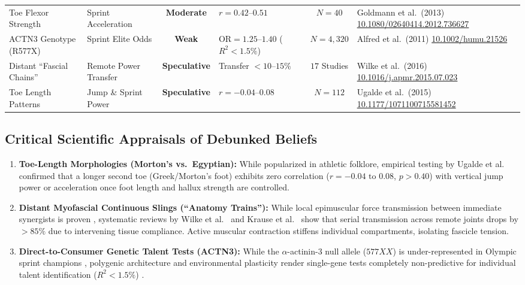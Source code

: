 \documentclass[11pt,a4paper]{article}
\begin{document}
\begin{table}[htbp]
\begin{tabularx}{\textwidth}{p{3.2cm}p{2.8cm}cp{2.2cm}cp{3.4cm}}
\addlinespace
Toe Flexor Strength & Sprint Acceleration & \textbf{Moderate} & $r = 0.42\text{--}0.51$ & $N = 40$ & Goldmann et al.\ (2013) \cite{goldmann2013} \newline \href{https://doi.org/10.1080/02640414.2012.736627}{10.1080/02640414.2012.736627} \\
\addlinespace
ACTN3 Genotype (R577X) & Sprint Elite Odds & \textbf{Weak} & $\text{OR} = 1.25\text{--}1.40$ ($R^2 < 1.5\%$) & $N = 4,320$ & Alfred et al.\ (2011) \cite{alfred2011} \newline \href{https://doi.org/10.1002/humu.21526}{10.1002/humu.21526} \\
\addlinespace
Distant ``Fascial Chains'' & Remote Power Transfer & \textbf{Speculative} & Transfer $< 10\text{--}15\%$ & $17$ Studies & Wilke et al.\ (2016) \cite{wilke2016} \newline \href{https://doi.org/10.1016/j.apmr.2015.07.023}{10.1016/j.apmr.2015.07.023} \\
\addlinespace
Toe Length Patterns & Jump \& Sprint Power & \textbf{Speculative} & $r = -0.04\text{--}0.08$ & $N = 112$ & Ugalde et al.\ (2015) \cite{ugalde2015} \newline \href{https://doi.org/10.1177/1071100715581452}{10.1177/1071100715581452} \\
\bottomrule
\end{tabularx}
\end{table}

\subsection{Critical Scientific Appraisals of Debunked Beliefs}
\begin{enumerate}
    \item \textbf{Toe-Length Morphologies (Morton's vs.\ Egyptian):} While popularized in athletic folklore, empirical testing by Ugalde et al.\ \cite{ugalde2015} confirmed that a longer second toe (Greek/Morton's foot) exhibits zero correlation ($r = -0.04\text{ to }0.08$, $p > 0.40$) with vertical jump power or acceleration once foot length and hallux strength are controlled.
    \item \textbf{Distant Myofascial Continuous Slings (``Anatomy Trains''):} While local epimuscular force transmission between immediate synergists is proven \cite{huijing1999, maas2010}, systematic reviews by Wilke et al.\ \cite{wilke2016} and Krause et al.\ \cite{krause2016} show that serial transmission across remote joints drops by $>85\%$ due to intervening tissue compliance. Active muscular contraction stiffens individual compartments, isolating fascicle tension.
    \item \textbf{Direct-to-Consumer Genetic Talent Tests (ACTN3):} While the $\alpha$-actinin-3 null allele ($577XX$) is under-represented in Olympic sprint champions \cite{yang2003}, polygenic architecture and environmental plasticity render single-gene tests completely non-predictive for individual talent identification ($R^2 < 1.5\%$) \cite{alfred2011, pickering2017}.
\end{enumerate}
\end{document}
